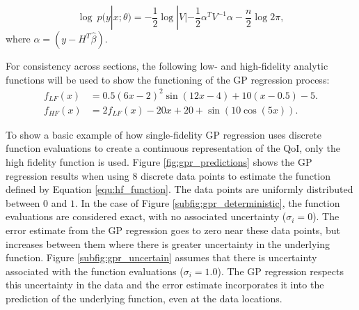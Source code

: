 \begin{equation}
    \log~p(y|x;\theta) = -\frac{1}{2} \log|V| - \frac{1}{2}\alpha^T V^{-1}\alpha - \frac{n}{2}\log 2\pi,
\end{equation}
where $\alpha = \left ( y-H^T\hat{\beta} \right )$.

For consistency across sections, the following low- and high-fidelity analytic functions will be used to show the functioning of the GP regression process: 
\begin{align} \label{equ:lf_function}
    f_{LF}(x) &= 0.5 \left ( 6x - 2\right )^2 \sin{ \left (12x -4 \right )} + 10 \left ( x - 0.5 \right ) -5.
\\ \label{equ:hf_function}
    f_{HF}(x) &= 2 f_{LF}(x) - 20x + 20 + \sin {\left ( 10 \cos{ \left ( 5x \right )}\right )}.
\end{align}

To show a basic example of how single-fidelity GP regression uses discrete function evaluations to create a continuous representation of the QoI, only the high fidelity function is used.
Figure \ref{fig:gpr_predictions} shows the GP regression results when using 8 discrete data points to estimate the function defined by Equation \ref{equ:hf_function}.
The data points are uniformly distributed between $0$ and $1$.
In the case of Figure \ref{subfig:gpr_deterministic}, the function evaluations are considered exact, with no associated uncertainty ($\sigma_i = 0$). 
The error estimate from the GP regression goes to zero near these data points, but increases between them where there is greater uncertainty in the underlying function. 
Figure \ref{subfig:gpr_uncertain} assumes that there is uncertainty associated with the function evaluations ($\sigma_i = 1.0$).
The GP regression respects this uncertainty in the data and the error estimate incorporates it into the prediction of the underlying function, even at the data locations. 

